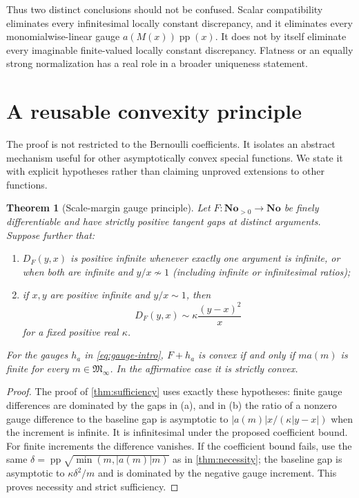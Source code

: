 \documentclass[11pt,letterpaper]{article}
\numberwithin{equation}{section}
\newtheorem{theorem}{Theorem}[section]
\theoremstyle{plain}
\theoremstyle{definition}
\theoremstyle{remark}
\newcommand{\No}{\mathbf{No}}
\newcommand{\Minf}{\mathfrak M_{\infty}}
\newcommand{\pp}{\operatorname{pp}}
\newcommand{\abs}[1]{\lvert#1\rvert}
\begin{document}
Thus two distinct conclusions should not be confused. Scalar compatibility
eliminates every infinitesimal locally constant discrepancy, and it
eliminates every monomialwise-linear gauge $a(M(x))\pp(x)$.
It does not by itself eliminate every imaginable finite-valued locally
constant discrepancy. Flatness or an equally strong normalization has a real
role in a broader uniqueness statement.

\section{A reusable convexity principle}\label{sec:general-principle}
The proof is not restricted to the Bernoulli coefficients. It isolates an
abstract mechanism useful for other asymptotically convex special functions.
We state it with explicit hypotheses rather than claiming unproved
extensions to other functions.

\begin{theorem}[Scale-margin gauge principle]\label{thm:abstract}
Let $F:\No_{>0}\to\No$ be finely differentiable and have strictly
positive tangent gaps at distinct arguments. Suppose further that:
\begin{enumerate}[label=(\alph*)]
\item $D_F(y,x)$ is positive infinite whenever exactly one argument is
infinite, or when both are infinite and $y/x\not\sim1$ (including
infinite or infinitesimal ratios);
\item if $x,y$ are positive infinite and $y/x\sim1$, then
\[
 D_F(y,x)\sim\kappa\frac{(y-x)^2}{x}
\]
for a fixed positive real $\kappa$.
\end{enumerate}
For the gauges $h_a$ in \eqref{eq:gauge-intro},
$F+h_a$ is convex if and only if $m a(m)$ is finite for every
$m\in\Minf$. In the affirmative case it is strictly convex.
\end{theorem}
\begin{proof}
The proof of \cref{thm:sufficiency} uses exactly these hypotheses:
finite gauge differences are dominated by the gaps in (a), and in (b) the
ratio of a nonzero gauge difference to the baseline gap is asymptotic to
$\abs{a(m)}x/(\kappa\abs{y-x})$ when the increment is infinite.
It is infinitesimal under the proposed coefficient bound. For finite
increments the difference vanishes.
If the coefficient bound fails, use the same
$\delta=\pp\sqrt{\min(m,\abs{a(m)}m)}$ as in
\cref{thm:necessity}; the baseline gap is asymptotic to
$\kappa\delta^2/m$ and is dominated by the negative gauge increment.
This proves necessity and strict sufficiency.
\end{proof}
\end{document}
